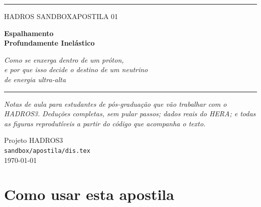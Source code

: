 \documentclass[11pt,a4paper,oneside]{report}
\begin{document}

\begin{titlepage}
\thispagestyle{empty}
\centering
\vspace*{22mm}

{\color{filete}\rule{\textwidth}{1.1pt}}

\vspace{9mm}
{\sffamily\large\color{acento}\MakeUppercase{HADROS Sandbox\quad\textbullet\quad Apostila 01}}

\vspace{12mm}
{\Huge\bfseries Espalhamento\\[2mm] Profundamente Inelástico\par}

\vspace{7mm}
{\Large\itshape Como se enxerga dentro de um próton,\\[1mm]
 e por que isso decide o destino de um neutrino\\[1mm] de energia ultra-alta\par}

\vspace{9mm}
{\color{filete}\rule{\textwidth}{1.1pt}}

\vspace{16mm}
\begin{minipage}{0.80\textwidth}
\centering\small\itshape\color{suave}
Notas de aula para estudantes de pós-graduação que vão trabalhar com o HADROS3.
Deduções completas, sem pular passos; dados reais do HERA; e todas as figuras
reprodutíveis a partir do código que acompanha o texto.
\end{minipage}

\vfill

\begin{minipage}{0.80\textwidth}
\centering\footnotesize\sffamily\color{suave}
Projeto HADROS3\\[1mm]
\texttt{sandbox/apostila/dis.tex}\\[3mm]
\today
\end{minipage}

\vspace{12mm}
\end{titlepage}

\chapter*{Como usar esta apostila}
\end{document}
